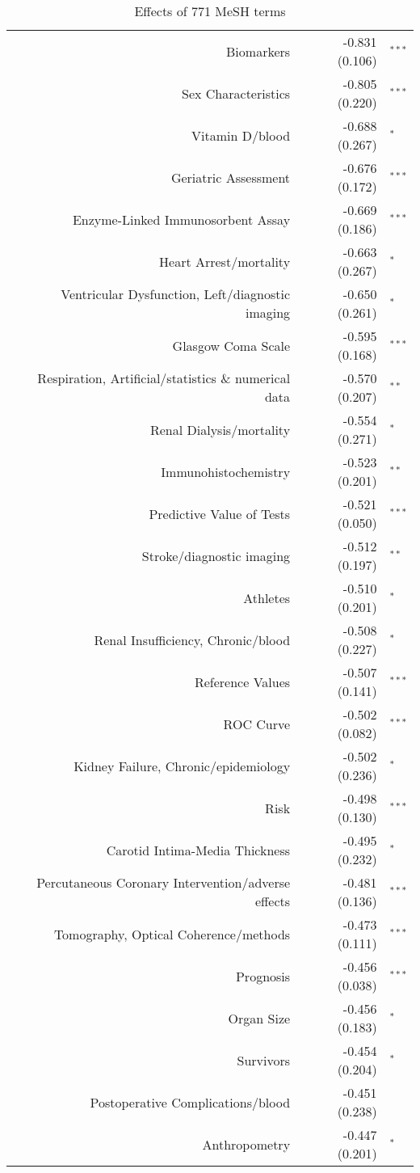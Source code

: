 \begin{longtable}[l]{rr@{}l@{ }} \caption{Effects of 771 MeSH terms} \\ 
Biomarkers & -0.831 (0.106) & $^{***}$\\
Sex Characteristics & -0.805 (0.220) & $^{***}$\\
Vitamin D/blood & -0.688 (0.267) & $^{*}$\\
Geriatric Assessment & -0.676 (0.172) & $^{***}$\\
Enzyme-Linked Immunosorbent Assay & -0.669 (0.186) & $^{***}$\\
Heart Arrest/mortality & -0.663 (0.267) & $^{*}$\\
Ventricular Dysfunction, Left/diagnostic imaging & -0.650 (0.261) & $^{*}$\\
Glasgow Coma Scale & -0.595 (0.168) & $^{***}$\\
Respiration, Artificial/statistics \& numerical data & -0.570 (0.207) & $^{**}$\\
Renal Dialysis/mortality & -0.554 (0.271) & $^{*}$\\
Immunohistochemistry & -0.523 (0.201) & $^{**}$\\
Predictive Value of Tests & -0.521 (0.050) & $^{***}$\\
Stroke/diagnostic imaging & -0.512 (0.197) & $^{**}$\\
Athletes & -0.510 (0.201) & $^{*}$\\
Renal Insufficiency, Chronic/blood & -0.508 (0.227) & $^{*}$\\
Reference Values & -0.507 (0.141) & $^{***}$\\
ROC Curve & -0.502 (0.082) & $^{***}$\\
Kidney Failure, Chronic/epidemiology & -0.502 (0.236) & $^{*}$\\
Risk & -0.498 (0.130) & $^{***}$\\
Carotid Intima-Media Thickness & -0.495 (0.232) & $^{*}$\\
Percutaneous Coronary Intervention/adverse effects & -0.481 (0.136) & $^{***}$\\
Tomography, Optical Coherence/methods & -0.473 (0.111) & $^{***}$\\
Prognosis & -0.456 (0.038) & $^{***}$\\
Organ Size & -0.456 (0.183) & $^{*}$\\
Survivors & -0.454 (0.204) & $^{*}$\\
Postoperative Complications/blood & -0.451 (0.238) & $^{}$\\
Anthropometry & -0.447 (0.201) & $^{*}$\\

\end{longtable}

